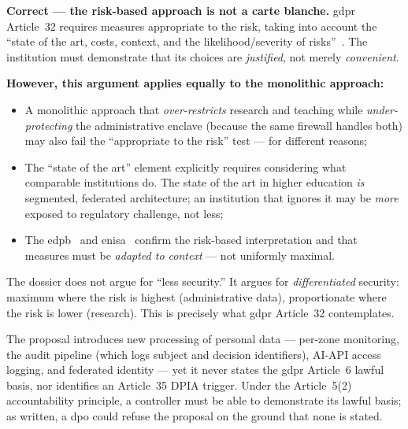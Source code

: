 \begin{answerbox}[Answer to Q8.2]
\textbf{Correct --- the risk-based approach is not a carte blanche.} \gls{gdpr} Article~32 requires measures appropriate to the risk, taking into account the ``state of the art, costs, context, and the likelihood/severity of risks''~\cite{gdpr}. The institution must demonstrate that its choices are \emph{justified}, not merely \emph{convenient}.

\medskip\noindent\textbf{However, this argument applies equally to the monolithic approach:}
\begin{itemize}[nosep]
    \item A monolithic approach that \emph{over-restricts} research and teaching while \emph{under-protecting} the administrative enclave (because the same firewall handles both) may also fail the ``appropriate to the risk'' test --- for different reasons;
    \item The ``state of the art'' element explicitly requires considering what comparable institutions do. The state of the art in higher education \emph{is} segmented, federated architecture; an institution that ignores it may be \emph{more} exposed to regulatory challenge, not less;
    \item The \gls{edpb}~\cite{edpb-guidelines} and \gls{enisa}~\cite{enisa-risk} confirm the risk-based interpretation and that measures must be \emph{adapted to context} --- not uniformly maximal.
\end{itemize}

\noindent The dossier does not argue for ``less security.'' It argues for \emph{differentiated} security: maximum where the risk is highest (administrative data), proportionate where the risk is lower (research). This is precisely what \gls{gdpr} Article~32 contemplates.
\end{answerbox}

\bigskip

\begin{questionbox}
The proposal introduces new processing of personal data --- per-zone monitoring, the audit pipeline (which logs subject and decision identifiers), AI-API access logging, and federated identity --- yet it never states the \gls{gdpr} Article~6 lawful basis, nor identifies an Article~35 DPIA trigger. Under the Article~5(2) accountability principle, a controller must be able to demonstrate its lawful basis; as written, a \gls{dpo} could refuse the proposal on the ground that none is stated.
\end{questionbox}

